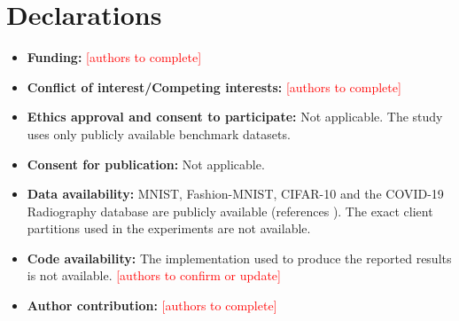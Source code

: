 \documentclass[pdflatex,sn-basic]{sn-jnl}
\newcommand{\todo}[1]{\textcolor{red}{[#1]}}
\begin{document}
\section*{Declarations}
\begin{itemize}
\item \textbf{Funding:} \todo{authors to complete}
\item \textbf{Conflict of interest/Competing interests:} \todo{authors to complete}
\item \textbf{Ethics approval and consent to participate:} Not applicable. The study uses only publicly available benchmark datasets.
\item \textbf{Consent for publication:} Not applicable.
\item \textbf{Data availability:} MNIST, Fashion-MNIST, CIFAR-10 and the COVID-19 Radiography database are publicly available (references \citealp{lecun2010,xiao2017,krizhevsky2009,rahman2020}). The exact client partitions used in the experiments are not available.
\item \textbf{Code availability:} The implementation used to produce the reported results is not available. \todo{authors to confirm or update}
\item \textbf{Author contribution:} \todo{authors to complete}
\end{itemize}


\end{document}
